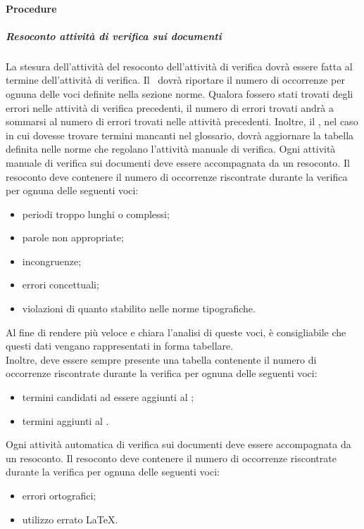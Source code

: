 \documentclass[../NormeProgetto.tex]{subfiles}
\begin{document}
		\paragraph{Procedure}
		\subparagraph{Resoconto attività di verifica sui documenti}	
				La stesura dell'attività del resoconto dell'attività di verifica dovrà essere fatta al termine dell'attività di verifica. Il \verificatore\ dovrà riportare il numero di occorrenze per ognuna delle voci definite nella sezione norme. Qualora fossero stati trovati degli errori nelle attività di verifica precedenti, il numero di errori trovati andrà a sommarsi al numero di errori trovati nelle attività precedenti.
				Inoltre, il \verificatore, nel caso in cui dovesse trovare termini mancanti nel glossario, dovrà aggiornare la tabella definita nelle norme che regolano l'attività manuale di verifica.
			Ogni attività manuale di verifica sui documenti deve essere accompagnata da un resoconto. Il resoconto deve contenere il numero di occorrenze riscontrate durante la verifica per ognuna delle seguenti voci:
			\begin{itemize}
				\item periodi troppo lunghi o complessi;
				\item parole non appropriate;
				\item incongruenze;
				\item errori concettuali;
				\item violazioni di quanto stabilito nelle norme tipografiche.		
			\end{itemize}
			Al fine di rendere più veloce e chiara l'analisi di queste voci, è consigliabile che questi dati vengano rappresentati in forma tabellare.\\
			Inoltre, deve essere sempre presente una tabella contenente il numero di occorrenze riscontrate durante la verifica per ognuna delle seguenti voci:
				\begin{itemize}
					\item termini candidati ad essere aggiunti al \glossario;
					\item termini aggiunti al \glossario.
				\end{itemize}
				Ogni attività automatica di verifica sui documenti deve essere accompagnata da un resoconto. Il resoconto deve contenere il numero di occorrenze riscontrate durante la verifica per ognuna delle seguenti voci:
				\begin{itemize}
				\item errori ortografici;
				\item utilizzo errato \LaTeX\g.
				\end{itemize}
			
\end{document}
